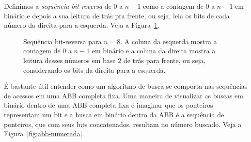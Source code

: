 Definimos a \textit{sequência bit-reversa} de $0$ a $n-1$ como a contagem de $0$ a $n-1$ em binário e depois a sua leitura de trás pra frente, ou seja, leia os bits de cada número da direita para a esquerda. Veja a Figura~\ref{fig:sequencia}.

\begin{figure}
    \caption{Sequência bit-reversa para $n = 8$. A coluna da esquerda mostra a contagem de $0$ a $n - 1$ em binário e a  coluna da direita mostra a leitura desses números em base 2 de trás para frente, ou seja, considerando os bits da direita para a esquerda.}
\label{fig:sequencia}
\end{figure}

É bastante útil entender como um algoritmo de busca se comporta nas sequências de acessos em uma ABB completa fixa. Uma maneira de visualizar as buscas em binário dentro de uma ABB completa fixa é imaginar que os ponteiros representam um bit e a busca em binário dentro da ABB é a sequência de ponteiros, que com seus bits concatenados, resultam no número buscado. Veja a Figura~\ref{fig:abb-numerada}.

